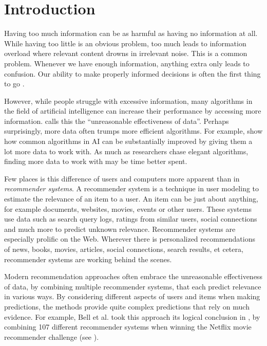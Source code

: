 \section{Introduction}
\label{sec:intro}

Having too much information can be as harmful as having no information at all.
While having too little is an obvious problem,
too much leads to information overload where relevant content drowns in irrelevant noise.
This is a common problem. Whenever we have enough information,
anything extra only leads to confusion.
Our ability to make properly informed decisions is often the first thing to go
\cite[p.1]{Davenport2001}.

However, while people struggle with excessive information,
many algorithms in the field of artificial intelligence
can increase their performance by accessing more information.
\cite{Halevy2009} calls this the ``unreasonable effectiveness of data''.
Perhaps surprisingly, more data often trumps more efficient algorithms.
For example, \cite[p.3]{Banko2001} show how common algorithms in AI 
can be substantially improved by giving them a lot more data to work with.
As much as researchers chase elegant algorithms, finding more data to work with may be time better spent.

Few places is this difference of users and computers more apparent than in \emph{recommender systems}.
A recommender system is a technique in user modeling to estimate the relevance of an item to a user.
An item can be just about anything, for example documents, websites, movies, events or other users.
These systems use data such as search query logs, 
ratings from similar users, social connections and much more
to predict unknown relevance.
Recommender systems are especially prolific on the Web. 
Wherever there is personalized recommendations of news, books, movies,
articles, social connections, search results, et cetera, recommender systems are working behind the scenes.

Modern recommendation approaches often embrace the 
unreasonable effectiveness of data,
by combining multiple recommender systems, that each predict relevance in various ways.
By considering different aspects of users and items when making predictions,
the methods provide quite complex predictions that rely on much evidence.
For example, Bell et al. took this approach its logical conclusion in \cite{Bell2007}, by 
combining 107 different recommender systems when winning the 
Netflix movie recommender challenge
(see \cite{Linden2009}).

